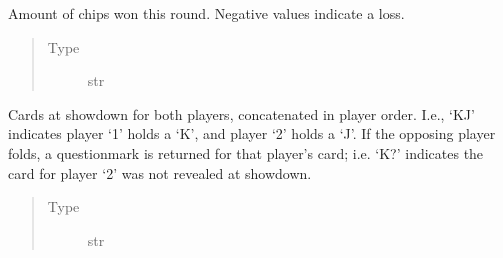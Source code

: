 \documentclass[letterpaper,10pt,english]{sphinxmanual}
\begin{document}
\begin{fulllineitems}
\begin{fulllineitems}
\end{fulllineitems}


\begin{fulllineitems}
\label{\detokenize{client:client.state.ClientGameRoundState._outcome}}
\pysigstartsignatures
{}
\pysigstopsignatures
\sphinxAtStartPar
Amount of chips won this round. Negative values indicate a loss.
\begin{quote}\begin{description}
\item[{Type}] \leavevmode
\sphinxAtStartPar
str

\end{description}\end{quote}

\end{fulllineitems}


\begin{fulllineitems}
\label{\detokenize{client:client.state.ClientGameRoundState._cards}}
\pysigstartsignatures
{}
\pysigstopsignatures
\sphinxAtStartPar
Cards at showdown for both players, concatenated in player order. I.e., ‘KJ’ indicates player ‘1’ holds a ‘K’,
and player ‘2’ holds a ‘J’. If the opposing player folds, a question\sphinxhyphen{}mark is returned for that player’s card;
i.e. ‘K?’ indicates the card for player ‘2’ was not revealed at showdown.
\begin{quote}\begin{description}
\item[{Type}] \leavevmode
\sphinxAtStartPar
str

\end{description}\end{quote}

\end{fulllineitems}


\begin{fulllineitems}
\label{\detokenize{client:client.state.ClientGameRoundState.add_move_history}}
\pysigstartsignatures
{}
\pysigstopsignatures
\end{fulllineitems}


\end{fulllineitems}
\end{document}
